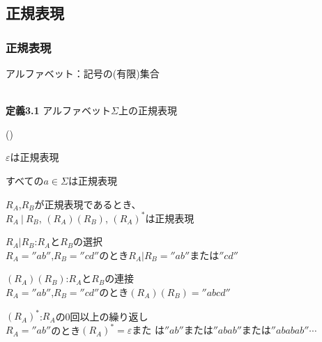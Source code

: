 \documentclass[ckj,dvipdfmx]{beamer}
\newcounter{coffee}
\begin{document}
\subsection{正規表現}

\begin{frame}
 \frametitle{正規表現}
 アルファベット：記号の(有限)集合\\
 \\
 \begin{screen}
  {\bf 定義3.1} アルファベット$\Sigma$上の正規表現
	\begin{list}{()}{}
	 \item $\varepsilon$は正規表現
	 \item すべての$a\in\Sigma$は正規表現
	 \item $R_A$,$R_B$が正規表現であるとき、\\
	       \qquad $R_A\ |\ R_B$,
	       $(R_A)(R_B)$, $(R_A)^\ast$は正規表現
	\end{list}
 \end{screen}
 {\scriptsize	
 \begin{list}{}{}
  \item $R_A|R_B$:$R_A$と$R_B$の選択\\
	$R_A=''ab''$,$R_B=''cd''$のとき$R_A|R_B=''ab''\mbox{または}''cd''$
  \item $(R_A)(R_B)$:$R_A$と$R_B$の連接\\
	$R_A=''ab''$,$R_B=''cd''$のとき$(R_A)(R_B)=''abcd''$
  \item $(R_A)^\ast$:$R_A$の0回以上の繰り返し\\
	$R_A=''ab''$のとき$(R_A)^\ast=\varepsilon\mbox{また
	は}''ab''\mbox{または}''abab''\mbox{または}''ababab''\cdots$
 \end{list}
 }
\end{frame}
\end{document}
